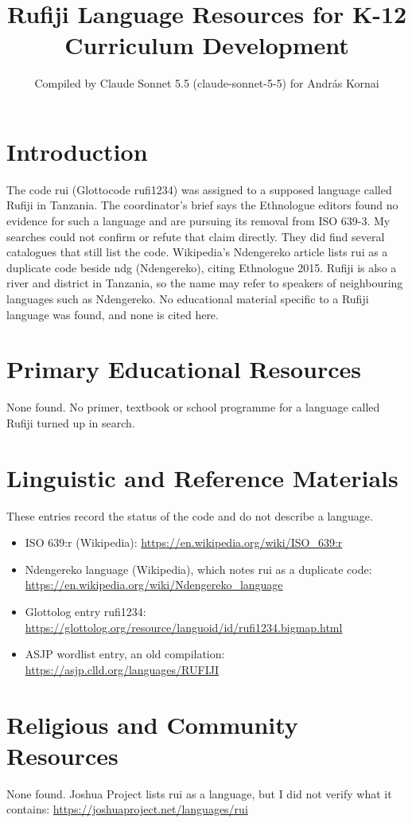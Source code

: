 \documentclass[12pt]{article}
\title{Rufiji Language Resources for K-12 Curriculum Development}
\author{Compiled by Claude Sonnet 5.5 (claude-sonnet-5-5) for Andr\'as Kornai}
\date{}
\begin{document}
\maketitle

\section{Introduction}
The code rui (Glottocode rufi1234) was assigned to a supposed language called Rufiji in Tanzania. The coordinator's brief says the Ethnologue editors found no evidence for such a language and are pursuing its removal from ISO 639-3. My searches could not confirm or refute that claim directly. They did find several catalogues that still list the code. Wikipedia's Ndengereko article lists rui as a duplicate code beside ndg (Ndengereko), citing Ethnologue 2015. Rufiji is also a river and district in Tanzania, so the name may refer to speakers of neighbouring languages such as Ndengereko. No educational material specific to a Rufiji language was found, and none is cited here.

\section{Primary Educational Resources}
None found. No primer, textbook or school programme for a language called Rufiji turned up in search.

\section{Linguistic and Reference Materials}
These entries record the status of the code and do not describe a language.
\begin{itemize}
\item ISO 639:r (Wikipedia): \url{https://en.wikipedia.org/wiki/ISO_639:r}
\item Ndengereko language (Wikipedia), which notes rui as a duplicate code: \url{https://en.wikipedia.org/wiki/Ndengereko_language}
\item Glottolog entry rufi1234: \url{https://glottolog.org/resource/languoid/id/rufi1234.bigmap.html}
\item ASJP wordlist entry, an old compilation: \url{https://asjp.clld.org/languages/RUFIJI}
\end{itemize}

\section{Religious and Community Resources}
None found. Joshua Project lists rui as a language, but I did not verify what it contains: \url{https://joshuaproject.net/languages/rui}
\end{document}

